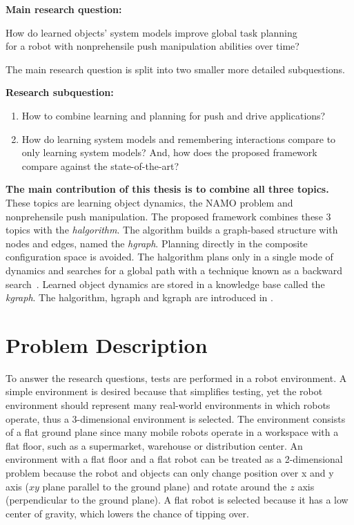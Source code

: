 \textbf{Main research question:}
\begin{center}%
\label{researchquestion:main}
\large
How do learned objects' system models improve global task planning\\for a robot with nonprehensile push manipulation abilities over time?
\end{center}

The main research question is split into two smaller more detailed subquestions.\bs

\textbf{Research subquestion:}
\begin{enumerate}
    \item\label{researchsubquestion:does_it_work} How to combine learning and planning for push and drive applications?
    \item\label{researchsubquestion:does_it_compare} How do learning system models and remembering interactions compare to only learning system models? And, how does the proposed framework compare against the state-of-the-art?
\end{enumerate}

\textbf{The main contribution of this thesis is to combine all three topics.} These topics are learning object dynamics, the \ac{NAMO} problem and nonprehensile push manipulation. The proposed framework combines these 3 topics with the \textit{\acl{halgorithm}}. The algorithm builds a graph-based structure with nodes and edges, named the \textit{\acl{hgraph}}. Planning directly in the composite configuration space is avoided. The \acl{halgorithm} plans only in a single mode of dynamics and searches for a global path with a technique known as a backward search~\cite{krontiris_dealing_2015}. Learned object dynamics are stored in a knowledge base called the \textit{\acl{kgraph}}. The \ac{halgorithm}, \ac{hgraph} and \ac{kgraph} are introduced in .\bs

\section{Problem Description}%
\label{sec:problem_description}
To answer the research questions, tests are performed in a robot environment. A simple environment is desired because that simplifies testing, yet the robot environment should represent many real-world environments in which robots operate, thus a 3-dimensional environment is selected. The environment consists of a flat ground plane since many mobile robots operate in a workspace with a flat floor, such as a supermarket, warehouse or distribution center. An environment with a flat floor and a flat robot can be treated as a 2-dimensional problem because the robot and objects can only change position over \gls{x} and \gls{y} axis ($xy$ plane parallel to the ground plane) and rotate around the $z$ axis (perpendicular to the ground plane). A flat robot is selected because it has a low center of gravity, which lowers the chance of tipping over.\bs

